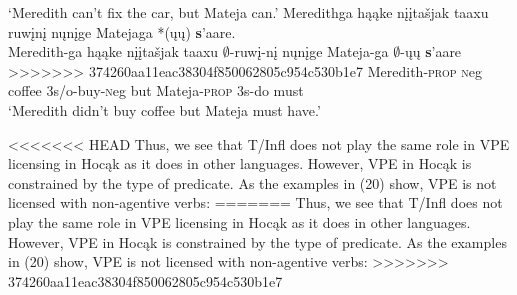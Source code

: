 \documentclass[output=paper]{LSP/langsci}
\begin{document}
\begin{exe}
\begin{xlist}
\trans `Meredith can't fix the car, but Mateja can.'
\ex
\glll Meredithga h\k{a}\k{a}ke {n\k{i}\k{i}ta\v{s}jak taaxu} ruw\k{i}n\k{i} n\k{u}n\k{i}ge Matejaga *(\k{u}\k{u}) {\textbf s'aare}.\\ 
Meredith-ga h\k{a}\k{a}ke {n\k{i}\k{i}ta\v{s}jak taaxu} $\emptyset$-ruw\k{i}-n\k{i} n\k{u}n\k{i}ge Mateja-ga $\emptyset$-\k{u}\k{u} {\textbf s'aare}\\
>>>>>>> 374260aa11eac38304f850062805c954c530b1e7
Meredith-\textsc{prop} {\textsc neg} coffee {\textsc 3s/o}-buy-{\textsc neg} but Mateja-\textsc{prop} {\textsc 3s}-do must\\
\trans `Meredith didn't buy coffee but Mateja must have.' 
\end{xlist}
\end{exe}

<<<<<<< HEAD
Thus, we see that T/Infl does not play the same role in VPE licensing in Hocąk as it does in other languages. However, VPE in Hocąk is constrained by the type of predicate. As the examples in (20) show, VPE is not licensed with non-agentive verbs:
=======
Thus, we see that T/Infl does not play the same role in VPE licensing in Hoc\k{a}k as it does in other languages. However, VPE in Hoc\k{a}k is constrained by the type of predicate. As the examples in (20) show, VPE is not licensed with non-agentive verbs:
>>>>>>> 374260aa11eac38304f850062805c954c530b1e7
\end{document}
